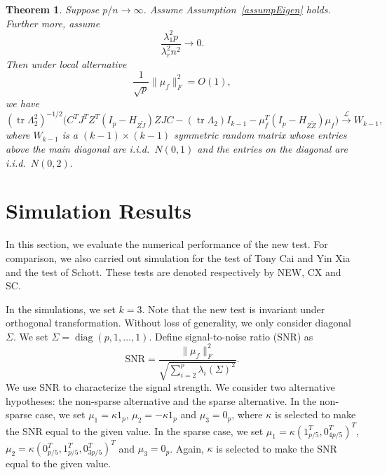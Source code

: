 \documentclass[review]{elsarticle}
\DeclareMathOperator{\mytr}{tr}
\DeclareMathOperator{\mydiag}{diag}
\theoremstyle{plain}
\newtheorem{theorem}{\quad\quad Theorem}
\theoremstyle{definition}
\theoremstyle{remark}
\begin{document}
\begin{theorem}\label{thm1}
    Suppose $p/n\to \infty$.
    Assume Assumption~\eqref{assumpEigen} holds.
    Further more, assume
\begin{equation}
    \frac{\lambda_1^2 p}{\lambda_r^2 n^2}\to 0.
\end{equation}
    Then under local alternative
    \begin{equation}
        \frac{1}{\sqrt{p}}\|\mu_f\|_F^2=O(1),
    \end{equation}
    we have
    \begin{equation}
        (\mytr \Lambda_2^2)^{-1/2}\big( C^TJ^T Z^T(I_p-H_{Z\tilde J}) ZJC-(\mytr \Lambda_2) I_{k-1} -\mu_f^T(I_p-H_{Z\tilde Z})\mu_f\big)\xrightarrow{\mathcal{L}} W_{k-1},
    \end{equation}
where $W_{k-1}$ is a $(k-1)\times(k-1)$ symmetric random matrix whose entries above the main diagonal are i.i.d.\ $N(0,1)$ and the entries on the diagonal are i.i.d.\ $N(0,2)$.
\end{theorem}

\section{Simulation Results}

In this section, we evaluate the numerical performance of the new test. For comparison, we also carried out simulation for the test of Tony Cai and Yin Xia and the test of Schott. These tests are denoted respectively by NEW, CX and SC.

In the simulations, we set $k=3$.
Note that the new test is invariant under orthogonal transformation.
Without loss of generality, we only consider diagonal $\Sigma$.
We set $\Sigma=\mydiag(p,1,\ldots,1)$.
Define signal-to-noise ratio (SNR) as
$$
\textrm{SNR}=\frac{\|\mu_f\|_F^2}{\sqrt{\sum_{i=2}^{p}\lambda_i(\Sigma)^2}}.
$$
We use SNR to characterize the signal strength.
We consider two alternative hypotheses: the non-sparse alternative and the sparse alternative.
In the non-sparse case, we set $\mu_1=\kappa 1_p$, $\mu_2=-\kappa 1_p$ and $\mu_3=0_p$, where $\kappa$ is selected to make the SNR equal to the given value.
In the sparse case, we set $\mu_1=\kappa (1_{p/5}^T,0_{4p/5}^T)^T$, $\mu_2=\kappa (0_{p/5}^T, 1_{p/5}^T,0_{3p/5}^T)^T$ and $\mu_3=0_p$. Again, $\kappa$ is selected to make the SNR equal to the given value.

\end{document}
